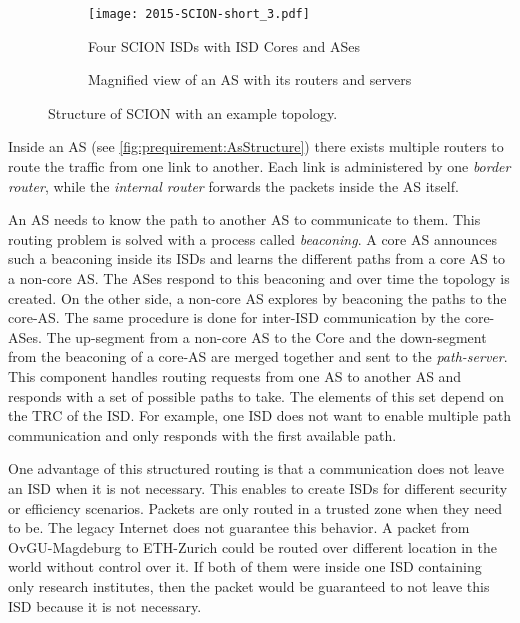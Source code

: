 \documentclass[thesis.tex]{subfiles}
\begin{document}
\begin{figure}[h]
	\centering
	\begin{subfigure}{.48\linewidth}
		\centering
		\texttt{[image: 2015-SCION-short\_3.pdf]}
		\caption{Four SCION ISDs with ISD Cores and ASes \cite[Figure~1]{SCIONPaper}}
		\label{fig:prequirement:scionStructure}
	\end{subfigure}
	\hfill
	\begin{subfigure}{0.48\linewidth}
		\centering
		\caption{Magnified view of an AS with its routers and servers \cite[Figure~2b]{SCIONPaper}}
		\label{fig:prequirement:AsStructure}
	\end{subfigure}
	\caption{Structure of SCION with an example topology.}
	\label{fig:prequirement:structureOfScion}
\end{figure}

Inside an AS (see \autoref{fig:prequirement:AsStructure}) there exists multiple routers to route the traffic from one link to another. Each link is administered by one \textit{border router}, while the \textit{internal router} forwards the packets inside the AS itself.

An AS needs to know the path to another AS to communicate to them. This routing problem is solved with a process called \textit{beaconing}. A core AS announces such a beaconing inside its ISDs and learns the different paths from a core AS to a non-core AS. The ASes respond to this beaconing and over time the topology is created. On the other side, a non-core AS explores by beaconing the paths to the core-AS. The same procedure is done for inter-ISD communication by the core-ASes. The up-segment from a non-core AS to the Core and the down-segment from the beaconing of a core-AS are merged together and sent to the \textit{path-server}. This component handles routing requests from one AS to another AS and responds with a set of possible paths to take. The elements of this set depend on the TRC of the ISD. For example, one ISD does not want to enable multiple path communication and only responds with the first available path.

One advantage of this structured routing is that a communication does not leave an ISD when it is not necessary. This enables to create ISDs for different security or efficiency scenarios. Packets are only routed in a trusted zone when they need to be. The legacy Internet does not guarantee this behavior. A packet from OvGU-Magdeburg to ETH-Zurich could be routed over different location in the world without control over it. If both of them were inside one ISD containing only research institutes, then the packet would be guaranteed to not leave this ISD because it is not necessary.
\end{document}
